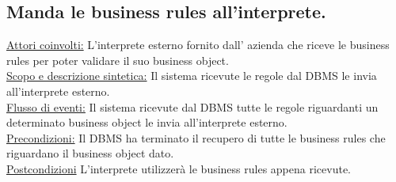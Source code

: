 \documentclass[11pt,titlepage,a4paper]{report}
\begin{document}
\subsection{Manda le business rules all'interprete.}
\underline{Attori coinvolti:} L'interprete esterno fornito dall' azienda che riceve le business rules per poter validare il suo business object.\\
\underline{Scopo e descrizione sintetica:} Il sistema ricevute le regole dal DBMS le invia all'interprete esterno.\\
\underline{Flusso di eventi:} Il sistema ricevute dal DBMS tutte le regole riguardanti un determinato business object le invia all'interprete esterno.\\
\underline{Precondizioni:} Il DBMS ha terminato il recupero di tutte le business rules che riguardano il business object dato.\\
\underline{Postcondizioni} L'interprete utilizzer\`a le business rules appena ricevute.
\end{document}
